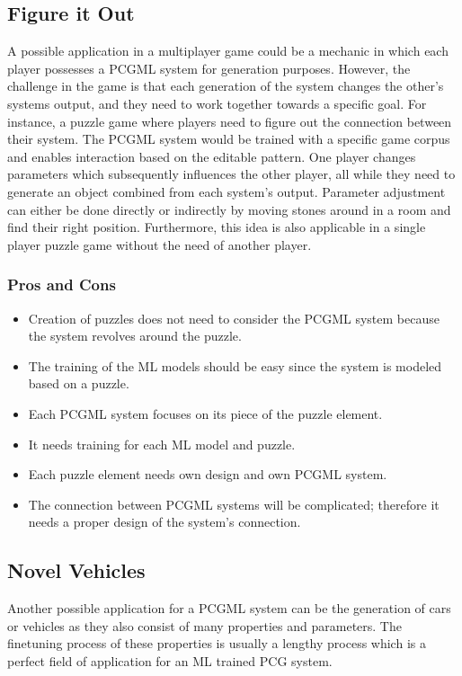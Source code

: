 \documentclass[MGS,Master,english]{twbook}%
\begin{document}
\subsection{Figure it Out} \label{idea::figureItOut}
A possible application in a multiplayer game could be a mechanic in which each player possesses a \ac{PCGML} system for generation purposes. However, the challenge in the game is that each generation of the system changes the other’s systems output, and they need to work together towards a specific goal. For instance, a puzzle game where players need to figure out the connection between their system. The \ac{PCGML} system would be trained with a specific game corpus and enables interaction based on the editable pattern. One player changes parameters which subsequently influences the other player, all while they need to generate an object combined from each system's output. Parameter adjustment can either be done directly or indirectly by moving stones around in a room and find their right position. Furthermore, this idea is also applicable in a single player puzzle game without the need of another player.

\subsubsection{Pros and Cons}
\begin{itemize}
	\item Creation of puzzles does not need to consider the \ac{PCGML} system because the system revolves around the puzzle.
	\item The training of the \ac{ML} models should be easy since the system is modeled based on a puzzle. 
	\item Each \ac{PCGML} system focuses on its piece of the puzzle element.
	\item It needs training for each \ac{ML} model and puzzle.
	\item Each puzzle element needs own design and own \ac{PCGML} system.
	\item The connection between \ac{PCGML} systems will be complicated; therefore it needs a proper design of the system’s connection.
\end{itemize}


\subsection{Novel Vehicles} \label{idea::novelCars}
Another possible application for a \ac{PCGML} system can be the generation of cars or vehicles as they also consist of many properties and parameters. The finetuning process of these properties is usually a lengthy process which is a perfect field of application for an \ac{ML} trained \ac{PCG} system.
\end{document}
